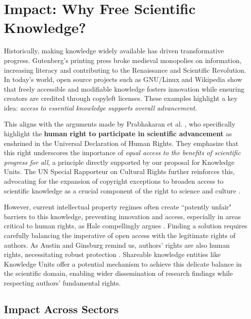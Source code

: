 \vspace{-0.2cm}
\section{Impact: Why Free Scientific Knowledge?}
\vspace{-0.1cm}

Historically, making knowledge widely available has driven transformative progress. Gutenberg’s printing press broke medieval monopolies on information, increasing literacy and contributing to the Renaissance and Scientific Revolution. In today's world, open source projects such as GNU/Linux and Wikipedia show that freely accessible and modifiable knowledge fosters innovation while ensuring creators are credited through copyleft licenses. These examples highlight a key idea: \textit{access to essential knowledge supports overall advancement.} 

This aligns with the arguments made by Prabhakaran et al. \cite{humanrightsbasedapproachresponsible}, who specifically highlight the \textbf{ human right to participate in scientific advancement} as enshrined in the Universal Declaration of Human Rights. They emphasize that this right underscores the importance of \textit{ equal access to the benefits of scientific progress for all}, a principle directly supported by our proposal for Knowledge Units. The UN Special Rapporteur on Cultural Rights further reinforces this, advocating for the expansion of copyright exceptions to broaden access to scientific knowledge as a crucial component of the right to science and culture \cite{scienceright}. 

However, current intellectual property regimes often create ``patently unfair" barriers to this knowledge, preventing innovation and access, especially in areas critical to human rights, as Hale compellingly argues \cite{patentlyunfair}. Finding a solution requires carefully balancing the imperative of open access with the legitimate rights of authors. As Austin and Ginsburg remind us, authors' rights are also human rights, necessitating robust protection \cite{authorhumanrights}. Shareable knowledge entities like Knowledge Units offer a potential mechanism to achieve this delicate balance in the scientific domain, enabling wider dissemination of research findings while respecting authors' fundamental rights.

\vspace{-0.2cm}
\subsection{Impact Across Sectors}

